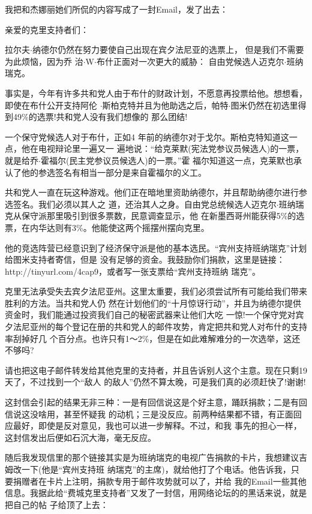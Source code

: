 ﻿\documentclass[11pt]{article}
\begin{document}
我把和杰娜丽她们所侃的内容写成了一封Email，发了出去：

亲爱的克里支持者们：

拉尔夫$\cdot$纳德尔仍然在努力要使自己出现在宾夕法尼亚的选票上， 但是我们不需要为此烦恼，因为乔
治$\cdot$W$\cdot$布什正面对一次更大的威胁： 自由党候选人迈克尔$\cdot$班纳瑞克。

事实是，今年有许多共和党人由于布什的财政计划，不愿意再投票给他。想想看，即使在布什公开支持阿伦
$\cdot$斯柏克特并且为他助选之后，帕特$\cdot$图米仍然在初选里得到49\%的选票!共和党人没有我们想像的
那么团结!

一个保守党候选人对于布什，正如4 年前的纳德尔对于戈尔。斯柏克特知道这一点，他在电视辩论里一遍又一
遍地说：``给克莱默(宪法党参议员候选人)的一票，就是给乔$\cdot$霍福尔(民主党参议员候选人)的一票。''霍
福尔知道这一点，克莱默也承认了他的参选签名有相当一部分是来自霍福尔的义工。

共和党人一直在玩这种游戏。他们正在暗地里资助纳德尔，并且帮助纳德尔进行参选签名。我们必须以其人之
道，还治其人之身。自由党总统候选人迈克尔$\cdot$班纳瑞克从保守派那里吸引到很多票数，民意调查显示，他
在新墨西哥州能获得5\%的选票，在内华达则有3\%。他能使这两个摇摆州摆向克里。

他的竞选阵营已经意识到了经济保守派是他的基本选民。``宾州支持班纳瑞克''计划给图米支持者寄信，但是
没有足够的资金。我鼓励你们捐款，这里是链接：http://tinyurl.com/4cap9，或者写一张支票给``宾州支持班纳
瑞克''。

克里无法承受失去宾夕法尼亚州。这里太重要，我们必须尝试所有可能给我们带来胜利的方法。当共和党人仍
然在计划他们的``十月惊讶行动''，并且为纳德尔提供资金时，我们能通过投资我们自己的秘密武器来让他们大吃
一惊!一个保守党对宾夕法尼亚州的每个登记在册的共和党人的邮件攻势，肯定把共和党人对布什的支持率刮掉好几
个百分点。也许只有1～2\%，但是在如此难解难分的一次选举，这还不够吗?


请也把这电子邮件转发给其他克里的支持者，并且告诉别人这个主意。现在只剩19天了，不过找到一个``敌人
的敌人''仍然不算太晚，可是我们真的必须赶快了!谢谢!

这封信会引起的结果无非三种：一是有回信说这是个好主意，踊跃捐款；二是有回信说这没啥用，甚至怀疑我
的动机；三是没反应。前两种结果都不错，有正面回应最好，即使是反对意见，我也可以进一步解释。不过，和我
事先的担心一样，这封信发出后便如石沉大海，毫无反应。

随后我发现信里的那个链接其实是为班纳瑞克的电视广告捐款的卡片，我想建议吉姆改一下(他是``宾州支持班
纳瑞克''的主席)，就给他打了个电话。他告诉我，只要捐赠者在卡片上注明，捐款专用于邮件攻势就可以了，并给
我的Email一些其他信息。我据此给``费城克里支持者''又发了一封信，用网络论坛的的黑话来说，就是把自己的帖
子给顶了上去：
\end{document}
